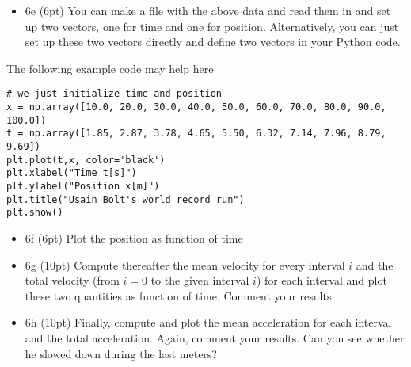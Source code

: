 \documentclass[%
oneside,                 %
final,                   %
10pt]{article}
\begin{document}
\noindent
\begin{itemize}
\item 6e (6pt) You can make a file with the above data and read them in and set up two vectors, one for time and one for position. Alternatively, you can just set up these two vectors directly and define two vectors in your Python code.
\end{itemize}

\noindent
The following example code may help here









\begin{verbatim}
# we just initialize time and position
x = np.array([10.0, 20.0, 30.0, 40.0, 50.0, 60.0, 70.0, 80.0, 90.0, 100.0])
t = np.array([1.85, 2.87, 3.78, 4.65, 5.50, 6.32, 7.14, 7.96, 8.79, 9.69])
plt.plot(t,x, color='black')
plt.xlabel("Time t[s]")
plt.ylabel("Position x[m]")
plt.title("Usain Bolt's world record run")
plt.show()

\end{verbatim}


\begin{itemize}
\item 6f (6pt) Plot the position as function of time

\item 6g (10pt) Compute thereafter the mean velocity for every interval $i$ and the total velocity (from $i=0$ to the given interval $i$) for each interval and plot these two quantities as function of time. Comment your results.

\item 6h (10pt) Finally, compute and plot the mean acceleration for each interval and the total acceleration. Again, comment your results. Can you see whether he slowed down during the last meters? 
\end{itemize}

\noindent

\end{document}
